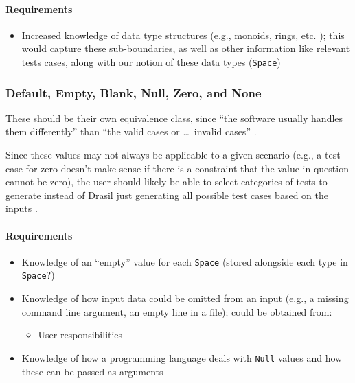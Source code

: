 \paragraph{Requirements}
\begin{itemize}
      \item Increased knowledge of data type structures (e.g., monoids, rings,
            etc. \citep{june_11_meeting}); this would capture these sub-boundaries,
            as well as other information like relevant tests cases, along with
            our notion of these data types (\texttt{Space})
\end{itemize}

\subsubsection[Default, Empty, Blank, Null, Zero, and None]{Default, Empty,
      Blank, Null, Zero, and None \citep[pp.~77-78]{Patton2006}}

These should be their own equivalence class, since ``the software usually
handles them differently'' than ``the valid cases or \dots\ invalid cases''
\citep[p.~78]{Patton2006}.

Since these values may not always be applicable to a given scenario (e.g., a
test case for zero doesn't make sense if there is a constraint that the value
in question cannot be zero), the user should likely be able to select
categories of tests to generate instead of Drasil just generating all possible
test cases based on the inputs \citep{june_11_meeting}.

\paragraph{Requirements}
\begin{itemize}
      \item Knowledge of an ``empty'' value for each \texttt{Space} (stored
            alongside each type in \texttt{Space}?)
      \item Knowledge of how input data could be omitted from an input
            (e.g., a missing command line argument, an empty line in a file);
            could be obtained from:
            \begin{itemize}
                  \item User responsibilities
            \end{itemize}
      \item Knowledge of how a programming language deals with \texttt{Null}
            values and how these can be passed as arguments
\end{itemize}

